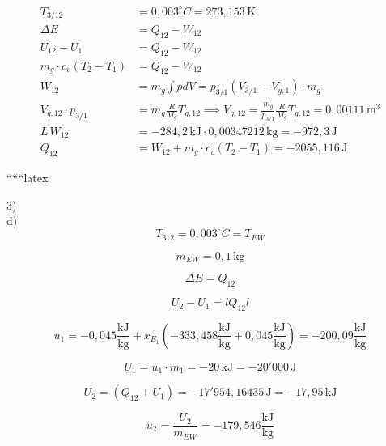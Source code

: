 \begin{align*}
T_{3/12} &= 0,003^\circ C = 273,153 \, \text{K} \\
\Delta E &= Q_{12} - W_{12} \\
U_{12} - U_1 &= Q_{12} - W_{12} \\
m_g \cdot c_v (T_2 - T_1) &= Q_{12} - W_{12} \\
W_{12} &= m_g \int pdV = p_{3/1} (V_{3/1} - V_{g,1}) \cdot m_g \\
V_{g,12} \cdot p_{3/1} &= m_g \frac{R}{M_g} T_{g,12} \implies V_{g,12} = \frac{m_g}{p_{3/1}} \frac{R}{M_g} T_{g,12} = 0,00111 \, \text{m}^3 \\
L \, W_{12} &= -284,2 \, \text{kJ} \cdot 0,00347212 \, \text{kg} = -972,3 \, \text{J} \\
Q_{12} &= W_{12} + m_g \cdot c_v (T_2 - T_1) = -2055,116 \, \text{J}
\end{align*}

``````latex


3) \\
d) \\

\[
T_{312} = 0,003^\circ C = T_{EW}
\]

\[
m_{EW} = 0,1 \, \text{kg}
\]

\[
\Delta E = Q_{12}
\]

\[
U_2 - U_1 = lQ_{12}l
\]

\[
u_1 = -0,045 \frac{\text{kJ}}{\text{kg}} + x_{E_{1}} \left( -333,458 \frac{\text{kJ}}{\text{kg}} + 0,045 \frac{\text{kJ}}{\text{kg}} \right) = -200,09 \frac{\text{kJ}}{\text{kg}}
\]

\[
U_1 = u_1 \cdot m_1 = -20 \, \text{kJ} = -20'000 \, \text{J}
\]

\[
U_2 = (Q_{12} + U_1) = -17'954,16435 \, \text{J} = -17,95 \, \text{kJ}
\]

\[
u_2 = \frac{U_2}{m_{EW}} = -179,546 \frac{\text{kJ}}{\text{kg}}
\]

